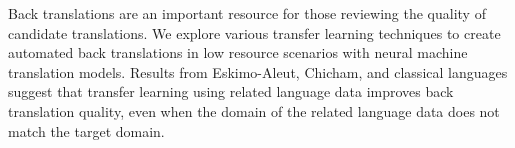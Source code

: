 Back translations are an important resource for those reviewing the quality of candidate translations. We explore various transfer learning techniques to create automated back translations in low resource scenarios with neural machine translation models. Results from Eskimo-Aleut, Chicham, and classical languages suggest that transfer learning using related language data improves back translation quality, even when the domain of the related language data does not match the target domain.
